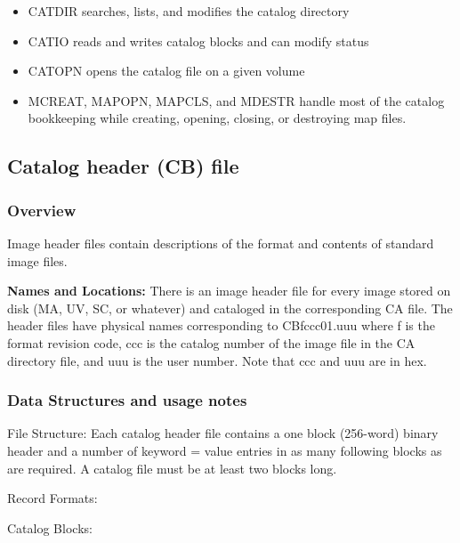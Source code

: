 \begin{itemize}
\item CATDIR  searches, lists, and modifies the catalog
directory
\item CATIO   reads and writes catalog blocks and can
modify status
\item CATOPN  opens the catalog file on a given volume
\item  MCREAT, MAPOPN,
MAPCLS, and MDESTR handle most of the
catalog bookkeeping while creating, opening, closing, or destroying
map files.
\end{itemize}

\subsection{Catalog header (CB) file}
\subsubsection{ Overview}


  Image header files contain descriptions of the format
     and contents of standard image files.

{\bf Names and Locations:} There is an image header file for every
image stored on disk (MA, UV, SC, or whatever) and cataloged in the
corresponding CA file.  The header files have physical names
corresponding to CBfccc01.uuu where f is the format revision code, ccc
is the catalog number of the image file in the CA directory file, and
uuu is the user number.  Note that ccc and uuu are in hex.

\subsubsection{ Data Structures and usage notes}

     File Structure:  Each catalog header file contains a one block
(256-word) binary header and a number of keyword = value entries in as
many following blocks as are required.  A catalog file must be at least
two blocks long.

     Record Formats:

Catalog Blocks:

